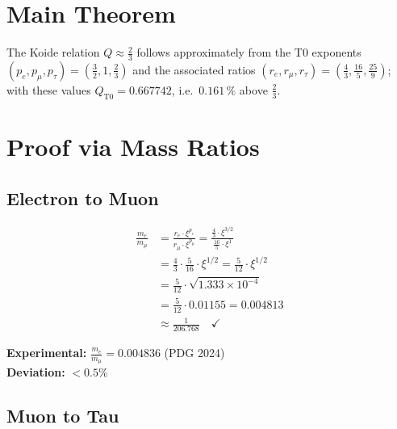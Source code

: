 	\section{Main Theorem}
	
	\begin{theorem}
		The Koide relation $Q \approx \frac{2}{3}$ follows approximately from the T0 exponents $(p_e, p_\mu, p_\tau) = \left(\frac{3}{2}, 1, \frac{2}{3}\right)$ and the associated ratios $(r_e, r_\mu, r_\tau) = \left(\frac{4}{3}, \frac{16}{5}, \frac{25}{9}\right)$; with these values $Q_{\text{T0}} = 0.667742$, i.e.\ $0.161\,\%$ above $\frac{2}{3}$.
	\end{theorem}
	
	\section{Proof via Mass Ratios}
	
	\subsection{Electron to Muon}
	
	\begin{beweis}
		\allowdisplaybreaks
		\begin{align}
			\frac{m_e}{m_\mu} &= \frac{r_e \cdot \xi^{p_e}}{r_\mu \cdot \xi^{p_\mu}} = \frac{\frac{4}{3} \cdot \xi^{3/2}}{\frac{16}{5} \cdot \xi^1} \\
			&= \frac{4}{3} \cdot \frac{5}{16} \cdot \xi^{1/2} = \frac{5}{12} \cdot \xi^{1/2} \\
			&= \frac{5}{12} \cdot \sqrt{1.333 \times 10^{-4}} \\
			&= \frac{5}{12} \cdot 0.01155 = 0.004813 \\
			&\approx \frac{1}{206.768} \quad \checkmark
		\end{align}
		
		\textbf{Experimental:} $\frac{m_e}{m_\mu} = 0.004836$ (PDG 2024)\\
		\textbf{Deviation:} $< 0.5\%$
	\end{beweis}
	
	\subsection{Muon to Tau}
	
